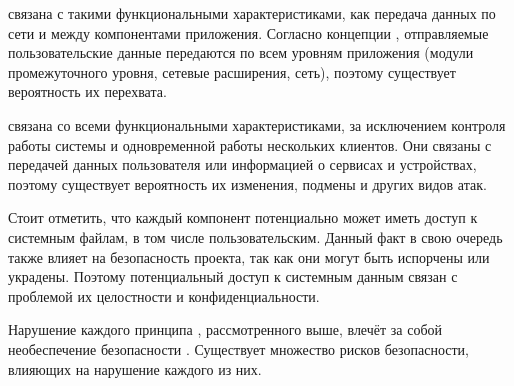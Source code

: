 %
 связана с такими функциональными характеристиками, как передача данных по сети и между компонентами приложения. 
%
Согласно концепции , отправляемые пользовательские данные передаются по всем уровням приложения (модули промежуточного уровня, сетевые расширения, сеть), поэтому существует вероятность их перехвата.

%
 связана со всеми функциональными характеристиками, за исключением контроля работы системы и одновременной работы нескольких клиентов. 
%
Они связаны с передачей данных пользователя или информацией о сервисах и устройствах, поэтому существует вероятность их изменения, подмены и других видов атак.

%
Стоит отметить, что каждый компонент  потенциально может иметь доступ к системным файлам, в том числе пользовательским. 
%
Данный факт в свою очередь также влияет на безопасность проекта, так как они могут быть испорчены или украдены. 
%
Поэтому потенциальный доступ к системным данным связан с проблемой их целостности и конфиденциальности. 

%
Нарушение каждого принципа , рассмотренного выше, влечёт за собой необеспечение безопасности . 
%
Существует множество рисков безопасности, влияющих на нарушение каждого из них.